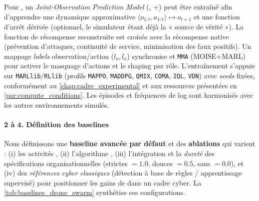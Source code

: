 Pour \texttt{}, un \textit{Joint-Observation Prediction Model} (, +) peut être entraîné afin d'apprendre une dynamique approximative $\langle o_{1:t}, a_{1:t} \rangle \mapsto o_{t+1}$ et une fonction d'arrêt dérivée (optionnel, le simulateur étant déjà la « source de vérité »). La fonction de récompense reconstruite est croisée avec la récompense native (prévention d'attaques, continuité de service, minimisation des faux positifs). Un mappage \emph{labels} observation/action ($l_o, l_a$) synchronise  et \texttt{MMA} (MOISE+MARL) pour activer le masquage d'actions et le shaping par rôle. L'entraînement s'appuie sur \texttt{MARLlib}/\texttt{RLlib} (profils \texttt{MAPPO}, \texttt{MADDPG}, \texttt{QMIX}, \texttt{COMA}, \texttt{IQL}, \texttt{VDN}) avec \textit{seeds} fixées, conformément au \autoref{chap:cadre_experimental} et aux ressources présentées en \autoref{par:compute_conditions}. Les épisodes et fréquences de log sont harmonisés avec les autres environnements simulés.

\paragraph{2 à 4. Définition des baselines}

Nous définissons une \textbf{baseline avancée par défaut} et des \textbf{ablations} qui varient : (i) les activités , (ii) l'algorithme , (iii) l'intégration et la \textit{dureté} des spécifications organisationnelles (strictes $=1.0$, douces $=0.5$, sans $=0.0$), et (iv) des \textit{références cyber classiques} (détection à base de règles / apprentissage supervisé) pour positionner les gains de  dans un cadre cyber. La \autoref{tab:baselines_drone_swarm} synthétise ces configurations.


